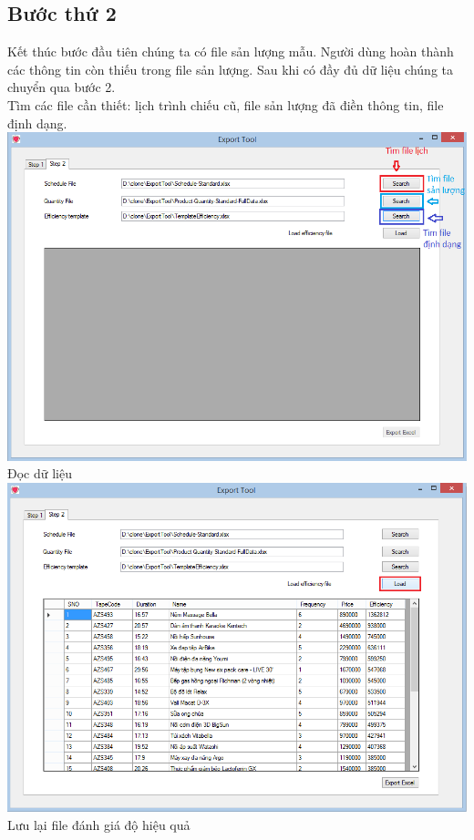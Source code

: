 \documentclass[11pt]{article}
\begin{document}
	\subsection{Bước thứ 2}
	Kết thúc bước đầu tiên chúng ta có file sản lượng mẫu. Người dùng hoàn thành các thông tin còn thiếu trong file sản lượng. Sau khi có đầy đủ dữ liệu chúng ta chuyển qua bước 2.\\
	Tìm các file cần thiết: lịch trình chiếu cũ, file sản lượng đã điền thông tin, file định dạng.\\
	\includegraphics[width=140mm]{im6.png}\\
	Đọc dữ liệu\\
	\includegraphics[width=140mm]{im7.png}\\
	Lưu lại file đánh giá độ hiệu quả\\
\end{document}
